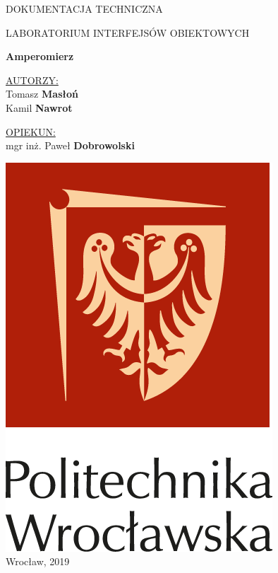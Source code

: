 \documentclass[12pt]{article}
\begin{document}
	\begin{titlepage}
		\begin{flushright}
			\Huge DOKUMENTACJA TECHNICZNA
		\end{flushright}
		\hrulefill
		\vspace*{4cm}
		\centering
		
		LABORATORIUM INTERFEJSÓW OBIEKTOWYCH
		\vspace*{0.5cm}
		
		{\fontsize{64}{1.2}\selectfont \textbf{Amperomierz}}
		
		\vspace*{4cm}
		\underline{\normalsize AUTORZY:} \\
		\Large Tomasz \textbf{Masłoń} \\
		\Large Kamil \textbf{Nawrot}
		
		\vspace*{0.5cm}
		
		\underline{\normalsize OPIEKUN:} \\
		\Large mgr inż. Paweł \textbf{Dobrowolski}
		
		\vspace*{\fill}
		\includegraphics[scale=0.3]{logo.png} \\
		{\footnotesize Wrocław, 2019}
	\end{titlepage}
\end{document}
